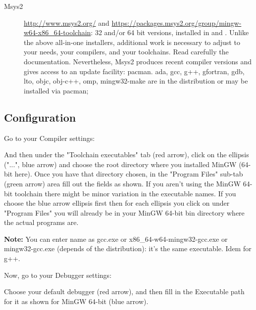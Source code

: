 \begin{description}
\item[Msys2] \url{http://www.msys2.org/} and \url{https://packages.msys2.org/group/mingw-w64-x86_64-toolchain}: 32 and/or 64 bit versions, installed in  and . Unlike the above all-in-one installers, additional work is necessary to adjust to your needs, your compilers, and your toolchains. Read carefully the documentation. Nevertheless, Msys2 produces recent compiler versions and gives access to an update facility: pacman. ada, gcc, g++, gfortran, gdb, lto, objc, obj-c++, omp, mingw32-make are in the distribution or may be installed via pacman;
\end{description}

\subsection{\codeblocks Configuration}

Go to your Compiler settings:


And then under the "Toolchain executables" tab (red arrow), click on the ellipsis ("...", blue arrow) and choose the root directory where you installed MinGW (64-bit here). Once you have that directory chosen, in the "Program Files" sub-tab (green arrow) area fill out the fields as shown. If you aren't using the MinGW 64-bit toolchain there might be minor variation in the executable names. If you choose the blue arrow ellipsis first then for each ellipsis you click on under "Program Files" you will already be in your MinGW 64-bit bin directory where the actual programs are.


\textbf{Note:} You can enter name as gcc.exe or x86\_64-w64-mingw32-gcc.exe or mingw32-gcc.exe (depends of the distribution): it's the same executable. Idem for g++.


Now, go to your Debugger settings:


Choose your default debugger (red arrow), and then fill in the Executable path for it as shown for MinGW 64-bit (blue arrow).

